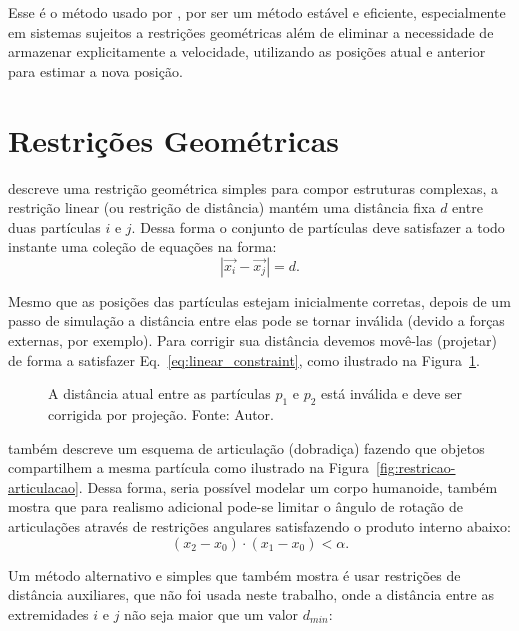 Esse é o método usado por , por ser um método estável e eficiente, especialmente em sistemas sujeitos a restrições geométricas além de eliminar a necessidade de armazenar explicitamente a velocidade, utilizando as posições atual e anterior para estimar a nova posição.

\section{Restrições Geométricas}

 descreve uma restrição geométrica simples para compor estruturas complexas, a restrição linear (ou restrição de distância) mantém uma distância fixa $d$ entre duas partículas $i$ e $j$. Dessa forma o conjunto de partículas deve satisfazer a todo instante uma coleção de equações na forma:
\begin{equation}
    |\vec{x_i} - \vec{x_j}| = d.
   \label{eq:linear_constraint}
\end{equation}

Mesmo que as posições das partículas estejam inicialmente corretas, depois de um passo de simulação a distância entre elas pode se tornar inválida (devido a forças externas, por exemplo). Para corrigir sua distância devemos movê-las (projetar) de forma a satisfazer Eq.~\ref{eq:linear_constraint}, como ilustrado na Figura~\ref{fig:correcao}.
\begin{figure}[htb]
	\centering
	
	\caption{A distância atual entre as partículas $p_1$ e $p_2$ está inválida e deve ser corrigida por projeção. Fonte: Autor.}
    \label{fig:correcao}
\end{figure}

 também descreve um esquema de articulação (dobradiça) fazendo que objetos compartilhem a mesma partícula como ilustrado na Figura~\ref{fig:restricao-articulacao}. Dessa forma, seria possível modelar um corpo humanoide,  também mostra que para realismo adicional pode-se limitar o ângulo de rotação de articulações através de restrições angulares satisfazendo o produto interno abaixo:
$$(x_2 - x_0) \cdot (x_1 - x_0) < \alpha.$$

Um método alternativo e simples que  também mostra é usar restrições de distância auxiliares, que não foi usada neste trabalho, onde a distância entre as extremidades $i$ e $j$ não seja maior que um valor $d_{min}$:

